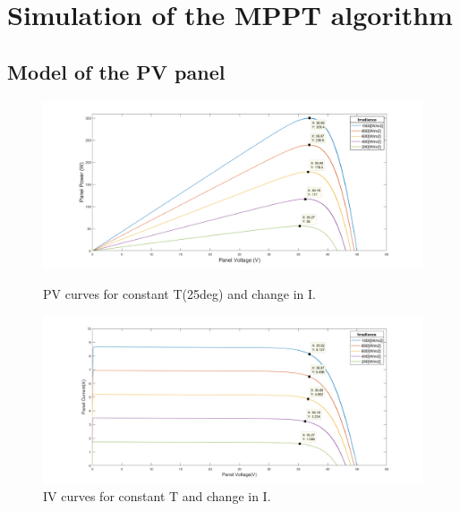 
\section{Simulation of the MPPT algorithm} \label{MPPTSimulation}
\subsection{Model of the PV panel}

\begin{figure}[H]
	\begin{minipage}[b]{0.55\linewidth}
		\centering
		\includegraphics[width=\textwidth]{../Pictures/PV_curves_T25degrees}
		\caption{PV curves for constant T(25deg) and change in I.}
		\label{fig:PVcurves_T25}
	\end{minipage}
	\hspace{0.5cm}
	\begin{minipage}[b]{0.55\linewidth}
		\centering
		\includegraphics[width=\textwidth]{../Pictures/IV_curves_T25degrees}
		\caption{IV curves for constant T and change in I.}
		\label{fig:IVcurves_T25}
	\end{minipage}
\end{figure}

